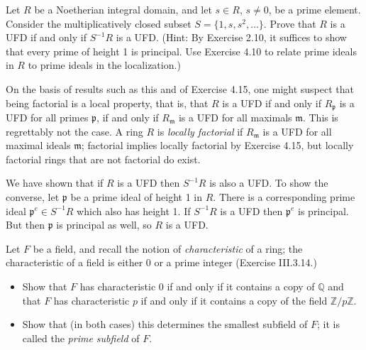 \documentclass[../../master.tex]{subfiles}
\begin{document}
    \begin{problem}
        Let $R$ be a Noetherian integral domain, and let $s \in R$, $s \neq 0$,
        be a prime element. Consider the multiplicatively closed subset $S =
        \{1, s, s^2, \ldots\}$. Prove that $R$ is a UFD if and only if
        $S^{-1}R$ is a UFD. (Hint: By Exercise 2.10, it suffices to show that
        every prime of height 1 is principal. Use Exercise 4.10 to relate prime
        ideals in $R$ to prime ideals in the localization.)

        On the basis of results such as this and of Exercise 4.15, one might
        suspect that being factorial is a local property, that is, that $R$ is a
        UFD if and only if $R_{\mathfrak{p}}$ is a UFD for all primes
        $\mathfrak{p}$, if and only if $R_{\mathfrak{m}}$ is a UFD for all
        maximals $\mathfrak{m}$. This is regrettably not the case. A ring $R$ is
        \textit{locally factorial} if $R_{\mathfrak{m}}$ is a UFD for all
        maximal ideals $\mathfrak{m}$; factorial implies locally factorial by
        Exercise 4.15, but locally factorial rings that are not factorial do
        exist.
    \end{problem}

    \begin{solution}
        We have shown that if $R$ is a UFD then $S^{-1}R$ is also a UFD. To show
        the converse, let $\mathfrak{p}$ be a prime ideal of height 1 in $R$. There is a
        corresponding prime ideal $\mathfrak{p}^{e} \in S^{-1}R$ which also has
        height 1. If $S^{-1}R$ is a UFD then $\mathfrak{p}^{e}$ is principal.
        But then $\mathfrak{p}$ is principal as well, so $R$ is a UFD.
    \end{solution}

    \begin{problem}
        Let $F$ be a field, and recall the notion of \textit{characteristic} of
        a ring; the characteristic of a field is either 0 or a prime integer
        (Exercise III.3.14.)
        \begin{itemize}
            \item Show that $F$ has characteristic 0 if and only if it contains
                a copy of $\mathbb{Q}$ and that $F$ has characteristic $p$ if
                and only if it contains a copy of the field $\mathbb{Z} /
                p\mathbb{Z}$.
            \item Show that (in both cases) this determines the smallest
                subfield of $F$; it is called the \textit{prime subfield} of
                $F$.
        \end{itemize}
    \end{problem}
\end{document}
